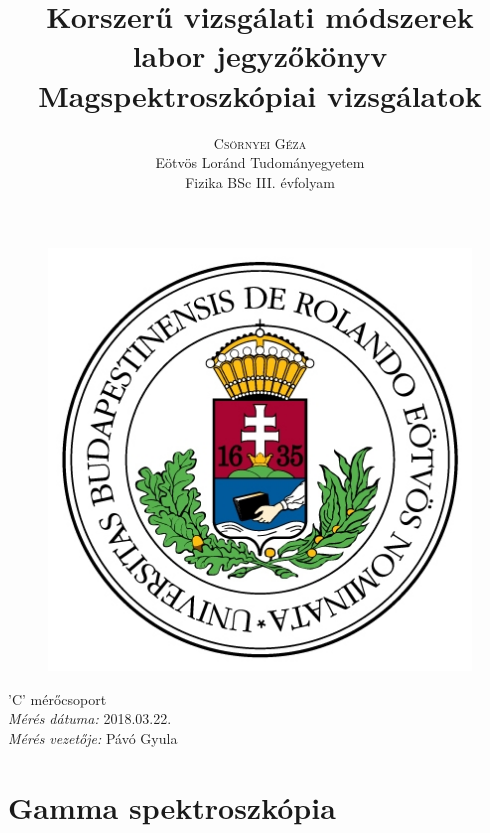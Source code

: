 \documentclass[12pt,a4paper]{article}
\title{\huge{Korszerű vizsgálati módszerek labor jegyzőkönyv}\\ \vspace{20pt}
\textbf{Magspektroszkópiai vizsgálatok} \\}
\author{\Large{\textsc{Csörnyei Géza}} \vspace{10pt}\\
	\textrm{Eötvös Loránd Tudományegyetem}\\
	\textrm{Fizika BSc III. évfolyam}
	}
\date{}
\begin{document}
\addtolength{\voffset}{-1.5cm}
\addtolength{\textheight}{1.5cm}
\begin{titlepage}
\maketitle

\begin{figure}[!htb]
\centering
  \includegraphics[scale=0.6]{eltecimer.jpg}
\end{figure}

\hfil \Large{'C' mérőcsoport}\hfil  \\
\vspace*{2pt}
\hfil \Large{\emph{Mérés dátuma:} 2018.03.22.}\hfil \\
\vspace*{2pt}
\hfil \hspace*{45pt} \Large{\emph{Mérés vezetője:} Pávó Gyula}\hfil
\thispagestyle{empty}
\end{titlepage}

\section{Gamma spektroszkópia}
\end{document}
